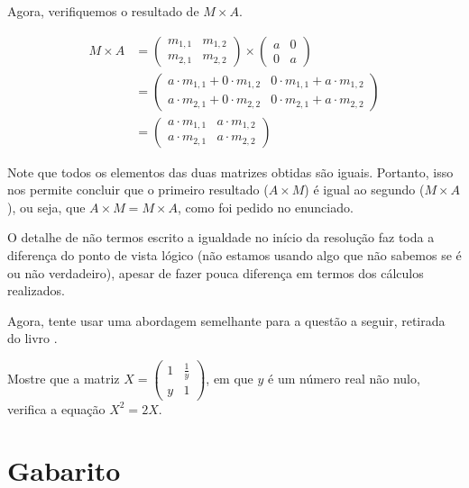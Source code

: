 \documentclass[main_estudante.tex]{subfiles}
\begin{document}
Agora, verifiquemos o resultado de $M \times A$.

\begin{equation*}\begin{align}
M \times A & {} = \begin{pmatrix}m_{1,1} & m_{1,2} \\ m_{2,1} & m_{2,2}\end{pmatrix} \times \begin{pmatrix}a & 0 \\ 0 & a\end{pmatrix} \\
& {} = \begin{pmatrix}a \cdot m_{1,1} + 0 \cdot m_{1,2} & 0 \cdot m_{1,1} + a \cdot m_{1,2} \\  a \cdot m_{2,1} + 0 \cdot m_{2,2} & 0 \cdot m_{2,1} + a \cdot m_{2,2}\end{pmatrix} \\
& {} = \begin{pmatrix}a \cdot m_{1,1} & a \cdot m_{1,2} \\ a \cdot m_{2,1} & a \cdot m_{2,2}\end{pmatrix}
\end{align}\end{equation*}

Note que todos os elementos das duas matrizes obtidas são iguais. Portanto, isso nos permite concluir que o primeiro resultado ($A \times M$) é igual ao segundo ($M \times A$), ou seja, que $A \times M = M \times A$, como foi pedido no enunciado.

O detalhe de não termos escrito a igualdade no início da resolução faz toda a diferença do ponto de vista lógico (não estamos usando algo que não sabemos se é ou não verdadeiro), apesar de fazer pouca diferença em termos dos cálculos realizados.

Agora, tente usar uma abordagem semelhante para a questão a seguir, retirada do livro .

\begin{resolva}
Mostre que a matriz $X = \begin{pmatrix}1 & \frac{1}{y} \\ y & 1\end{pmatrix}$, em que $y$ é um número real não nulo, verifica a equação $X^2 = 2X$.
\end{resolva}

\newpage
\section{Gabarito}
\end{document}
